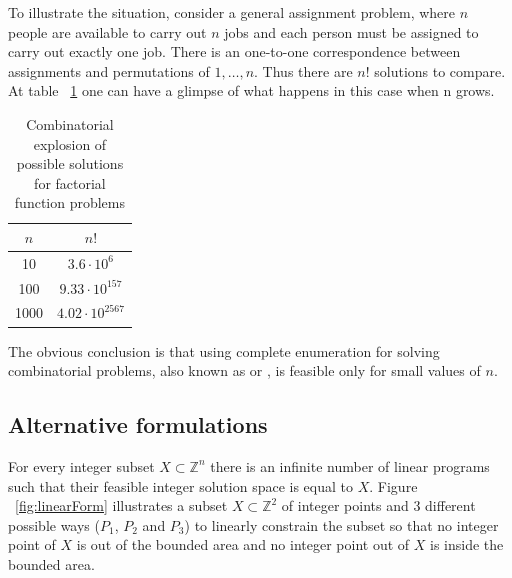 To illustrate the situation, consider a general assignment problem, where $n$ people are available to carry out $n$ jobs and each person must be assigned to carry out exactly one job. There is an one-to-one correspondence between assignments and permutations of ${1, \ldots ,n}$. Thus there are $n!$ solutions to compare. At table ~\ref{table:factorial} one can have a glimpse of what happens in this case when n grows.

\begin{table}[ht]
\caption{Combinatorial explosion of possible solutions for factorial function problems} %
\centering
\begin{tabular}{c c} 							%
\hline\hline 											%
$n$ & $n!$ \\ [0.5ex] 						%
\hline 														%
10 & $3.6 \cdot 10^6$ \\
100 & $9.33 \cdot 10^{157}$ \\
1000 & $4.02 \cdot 10^{2567}$ \\ [1ex] 	%
\hline
\end{tabular}
\label{table:factorial} 					%
\end{table}


The obvious conclusion is that using complete enumeration for solving combinatorial problems, also known as  or , is feasible only for small values of $n$.



\subsection{Alternative formulations}

For every integer subset $X \subset \mathbb{Z}^n$ there is an infinite number of linear programs such that their feasible integer solution space is equal to $X$. Figure ~\ref{fig:linearForm} illustrates a subset $X \subset \mathbb{Z}^2$ of integer points and 3 different possible ways ($P_{1}$, $P_{2}$ and $P_{3}$) to linearly constrain the subset so that no integer point of $X$ is out of the bounded area and no integer point out of $X$ is inside the bounded area.


